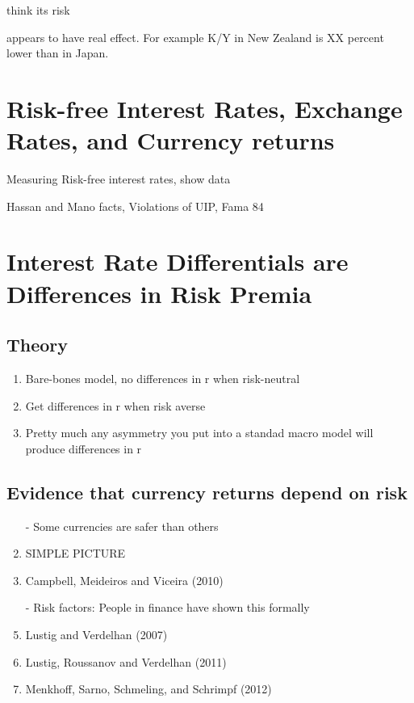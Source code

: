 \documentclass[12pt,letter]{article}
\theoremstyle{break} \theorembodyfont{\normalfont\itshape}
\theoremstyle{break}
\theoremstyle{break} \theorembodyfont{\normalfont\itshape}
\theoremstyle{break} \theorembodyfont{\normalfont\itshape}
\begin{document}
think its risk

appears to have real effect. For example K/Y in New Zealand is XX percent lower than in Japan.


\section{Risk-free Interest Rates, Exchange Rates, and Currency returns}

Measuring Risk-free interest rates, show data

Hassan and Mano facts, Violations of UIP, Fama 84

\section{Interest Rate Differentials are Differences in Risk Premia}
\subsection{Theory}
\begin{enumerate}
    \item Bare-bones model, no differences in r when risk-neutral
    \item Get differences in r when risk averse
    \item Pretty much any asymmetry you put into a standad macro model will produce differences in r
\end{enumerate}

\subsection{Evidence that currency returns depend on risk}
\begin{enumerate}
\item[-] Some currencies are safer than others
\item SIMPLE PICTURE
\item Campbell, Meideiros and Viceira (2010)
\item[-] Risk factors: People in finance have shown this formally
\item Lustig and Verdelhan (2007)
\item Lustig, Roussanov and Verdelhan (2011)
\item Menkhoff, Sarno, Schmeling, and Schrimpf (2012)
\end{enumerate}
\end{document}
